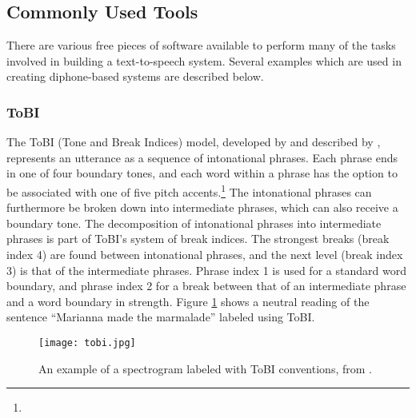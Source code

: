 \documentclass[12pt]{article}
\begin{document}
	\subsection{Commonly Used Tools}

	There are various free pieces of software available to perform many of the tasks involved in building a text-to-speech system. Several examples which are used in creating diphone-based systems are described below. \par

		\subsubsection{ToBI}
		The ToBI (Tone and Break Indices) model, developed by \citet{tobi} and described by \citet{slp}, represents an utterance as a sequence of intonational phrases. Each phrase ends in one of four boundary tones, and each word within a phrase has the option to be associated with one of five pitch accents.\footnote{} The intonational phrases can furthermore be broken down into intermediate phrases, which can also receive a boundary tone. The decomposition of intonational phrases into intermediate phrases is part of ToBI's system of break indices. The strongest breaks (break index 4) are found between intonational phrases, and the next level (break index 3) is that of the intermediate phrases. Phrase index 1 is used for a standard word boundary, and phrase index 2 for a break between that of an intermediate phrase and a word boundary in strength. Figure \ref{tobi1} shows a neutral reading  of the sentence ``Marianna made the marmalade'' labeled using ToBI. \par

		\begin{figure}
			\centering
			\texttt{[image: tobi.jpg]}
			\caption{An example of a spectrogram labeled with ToBI conventions, from \citet{guide}.}
			\label{tobi1}
		\end{figure}
\end{document}
